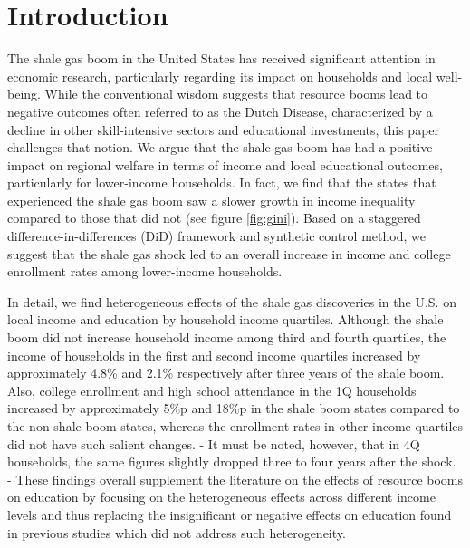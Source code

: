 \section{Introduction}
\label{sec:introduction}


The shale gas boom in the United States has received significant attention in 
economic research, particularly regarding its impact on households and local well-being. 
While the conventional wisdom suggests that resource booms lead to negative outcomes often referred to as
the Dutch Disease, characterized by a decline in other skill-intensive sectors and educational investments, this paper challenges that notion. 
We argue that the shale gas boom has had a positive impact on regional welfare in terms of income and local educational outcomes,
particularly for lower-income households.
In fact, we find that the states that experienced the shale gas boom saw a slower growth in income inequality compared to those that did not (see figure \ref{fig:gini}).
Based on a staggered difference-in-differences (DiD) framework and synthetic control method,
we suggest that the shale gas shock led to an overall increase in income and college enrollment rates among lower-income households.



In detail, we find heterogeneous effects of the shale gas discoveries in the U.S. on local income and education by household income quartiles. 
Although the shale boom did not increase household income among third and fourth quartiles, 
the income of households in the first and second income quartiles increased by approximately 4.8\% and 2.1\% respectively after three years of the shale boom.
Also, college enrollment and high school attendance in the 1Q households increased by approximately 5\%p and 18\%p in the shale boom states compared to the non-shale boom states, whereas the enrollment rates in other income quartiles did not have such salient changes.
 - It must be noted, however, that in 4Q households, the same figures slightly dropped three to four years after the shock. - 
These findings overall supplement the literature on the effects of resource booms on education
by focusing on the heterogeneous effects across different income levels and thus replacing
the insignificant or negative effects on education found in previous studies which did not address such heterogeneity.



